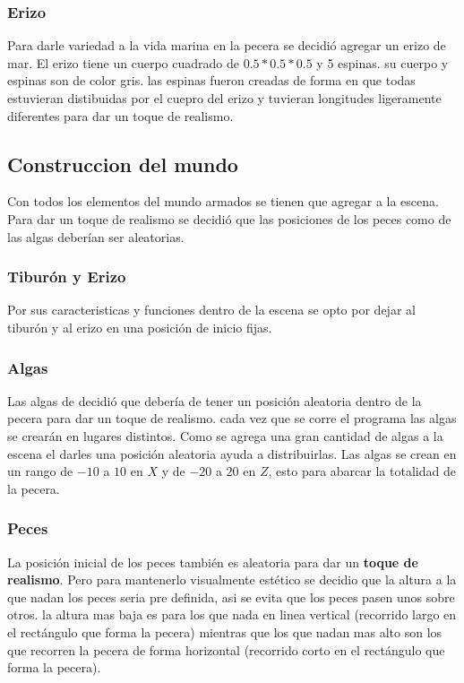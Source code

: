 \documentclass[10pt, a4paper, twocolumn]{article}
\begin{document}
\subsubsection{Erizo}
Para darle variedad a la vida marina en la pecera se decidió agregar un erizo de mar. El erizo tiene un cuerpo cuadrado de $0.5*0.5*0.5$ y 5 espinas. su cuerpo y espinas son de color gris. las espinas fueron creadas de forma en que todas estuvieran distibuidas por el cuepro del erizo y tuvieran longitudes ligeramente diferentes para dar un toque de realismo.

\subsection{Construccion del mundo}
Con todos los elementos del mundo armados se tienen que agregar a la escena. Para dar un toque de realismo se decidió que las posiciones de los peces como de las algas deberían ser aleatorias. 

\subsubsection{Tiburón y Erizo}
Por sus caracteristicas y funciones dentro de la escena se opto por dejar al tiburón y al erizo en una posición de inicio fijas.

\subsubsection{Algas}
Las algas de decidió que debería de tener un posición aleatoria dentro de la pecera para dar un toque de realismo. cada vez que se corre el programa las algas se crearán en lugares distintos. Como se agrega una gran cantidad de algas a la escena el darles una posición aleatoria ayuda a distribuirlas. Las algas se crean en un rango de $-10$ a $10$ en $X$ y de $-20$ a $20$ en $Z$, esto para abarcar la totalidad de la pecera.

\subsubsection{Peces}
La posición inicial de los peces también es aleatoria para dar un \textbf{toque de realismo}. Pero para mantenerlo visualmente estético se decidio que la altura a la que nadan los peces seria pre definida, asi se evita que los peces pasen unos sobre otros. la altura mas baja es para los que nada en linea vertical (recorrido largo en el rectángulo que forma la pecera) mientras que los que nadan mas alto son los que recorren la pecera de forma horizontal (recorrido corto en el rectángulo que forma la pecera).
\end{document}
